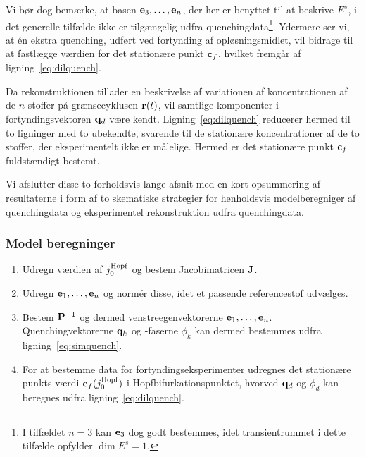 \vspace{4.0mm}
Vi b{\o}r dog bem{\ae}rke, at basen ${\bf e}_3,\ldots,{\bf
e}_n$, der her er benyttet til at beskrive $E^s$, i det
generelle tilf{\ae}lde ikke er tilg{\ae}ngelig udfra
quenchingdata\footnote{I tilf{\ae}ldet $n=3$ kan ${\bf
e}_3$ dog godt bestemmes, idet transientrummet i dette
tilf{\ae}lde opfylder $\dim E^s=1$.}. Ydermere ser vi, at
\'{e}n ekstra quenching, udf{\o}rt ved fortynding af
opl{\o}sningsmidlet, vil bidrage til at fastl{\ae}gge
v{\ae}rdien for det station{\ae}re punkt ${\bf c}_f$,
hvilket fremg{\aa}r af lig\-ning~\ref{eq:dilquench}.

\vspace{4.0mm}
Da rekonstruktionen tillader en beskrivelse af variationen
af koncentrationen af de $n$ stoffer p{\aa}
gr{\ae}nsecyklusen ${\bf r}(t)$, vil samtlige komponenter i
fortyndingsvektoren ${\bf q}_d$ v{\ae}re kendt.
Ligning~\ref{eq:dilquench} reducerer hermed til to
lig\-ninger med to ube\-kend\-te, svarende til de
station{\ae}re koncentrationer af de to stoffer, der
eksperimentelt ikke er m{\aa}lelige. Hermed er det
station{\ae}re punkt ${\bf c}_f$ fuldst{\ae}ndigt bestemt.

\vspace{4.0mm}
Vi afslutter disse to forholdsvis lange afsnit med en kort
opsummering af resultaterne i form af to skematiske
strategier for henholdsvis model\-beregniger af
quenchingdata og eksperimentel rekonstruktion udfra
quenchingdata.

\subsubsection{Model beregninger}
\begin{itemize}
\begin{enumerate}
 \item Udregn v{\ae}rdien af $j_0^{\rm Hopf}$ og bestem
  Jacobimatricen ${\bf J}$.
 \item Udregn ${\bf e}_1,\ldots,{\bf e}_n$ og norm\'{e}r
  disse, idet et passende referencestof udv{\ae}lges.
 \item Bestem ${\bf P}^{-1}$ og dermed venstreegenvektorerne
  ${\bf e}_1,\ldots,{\bf e}_n$. Quenchingvektorerne ${\bf
  q}_k$ og -faserne $\phi_k$ kan dermed bestemmes udfra
  lig\-ning~\ref{eq:simquench}.
 \item For at bestemme data for fortyndingseksperimenter udregnes
  det station{\ae}re punkts v{\ae}rdi ${\bf c}_f(j_0^{\rm
  Hopf})$ i Hopfbifurkationspunktet, hvor\-ved ${\bf q}_d$ og
  $\phi_d$ kan beregnes udfra lig\-ning~\ref{eq:dilquench}.
\end{enumerate}
\end{itemize}

